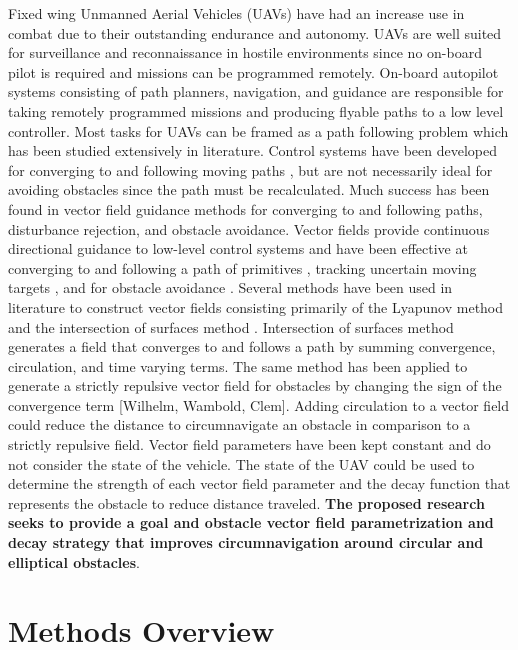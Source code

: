 \documentclass[numbered,pdftex]{ohio-etd}
\begin{document}
Fixed wing Unmanned Aerial Vehicles (UAVs) have had an increase use in combat due to their outstanding endurance and autonomy. UAVs are well suited for surveillance and reconnaissance in hostile environments since no on-board pilot is required and missions can be programmed remotely. On-board autopilot systems consisting of path planners, navigation, and guidance are responsible for taking remotely programmed missions and producing flyable paths to a low level controller. Most tasks for UAVs can be framed as a path following problem which has been studied extensively in literature. Control systems have been developed for converging to and following moving paths \cite{oliveira_moving_2016}, but are not necessarily ideal for avoiding obstacles since the path must be recalculated. Much success has been found in vector field guidance methods for converging to and following paths, disturbance rejection, and obstacle avoidance. Vector fields provide continuous directional guidance to low-level control systems and have been effective at converging to and following a path of primitives \cite{nelson_cooperative_2005}, tracking uncertain moving targets \cite{chen_tracking_2009}, and for obstacle avoidance \cite{chen_uav_2013}. Several methods have been used in literature to construct vector fields consisting primarily of the Lyapunov method \cite{nelson_cooperative_2005}\cite{griffiths_vector_2006}\cite{frew_cooperative_2007}\cite{frew_lyapunov_nodate}  and the intersection of surfaces method \cite{goncalves_artificial_2009}. Intersection of surfaces method generates a field that converges to and follows a path by summing convergence, circulation, and time varying terms. The same method has been applied to generate a strictly repulsive vector field for obstacles by changing the sign of the convergence term [Wilhelm, Wambold, Clem]. Adding circulation to a vector field could reduce the distance to circumnavigate an obstacle in comparison to a strictly repulsive field. Vector field parameters have been kept constant and do not consider the state of the vehicle. The state of the UAV could be used to determine the strength of each vector field parameter and the decay function that represents the obstacle to reduce distance traveled. \textbf{The proposed research seeks to provide a goal and obstacle vector field parametrization and decay strategy that improves circumnavigation around circular and elliptical obstacles}.


\section{Methods Overview}
\end{document}
